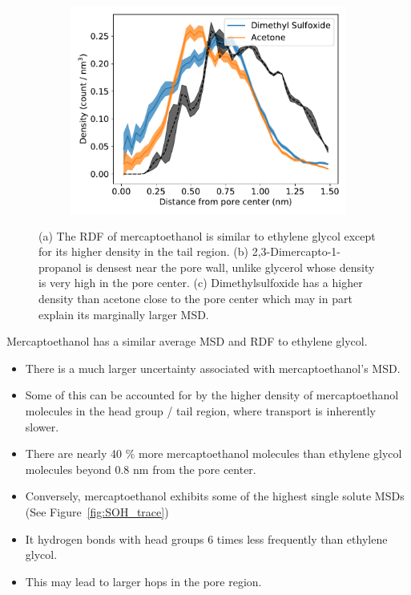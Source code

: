 \documentclass{article}
\begin{document}
\begin{figure}
\begin{subfigure}{0.325\linewidth}
  \includegraphics[width=\textwidth]{thiol_comparison_DMS.pdf}
  \caption{}\label{fig:DMP_GLY_comparison}
  \end{subfigure}
  \caption{(a) The RDF of mercaptoethanol is similar to ethylene glycol except 
  for its higher density in the tail region. (b) 2,3-Dimercapto-1-propanol is
  densest near the pore wall, unlike glycerol whose density is very high in the pore
  center. (c) Dimethylsulfoxide has a higher density than acetone close to the pore
  center which may in part explain its marginally larger MSD.}\label{fig:sulfur_analog_rdfs}
  \end{figure}
  
  \noindent Mercaptoethanol has a similar average MSD and RDF to ethylene glycol.
  \begin{itemize}
    \item There is a much larger uncertainty associated with mercaptoethanol's MSD.
    \item Some of this can be accounted for by the higher density of mercaptoethanol 
    molecules in the head group / tail region, where transport is inherently slower. 
    \item There are nearly 40 \% more mercaptoethanol molecules than ethylene 
    glycol molecules beyond 0.8 nm from the pore center. 
    \item Conversely, mercaptoethanol exhibits some of the highest single solute MSDs 
    (See Figure~\ref{fig:SOH_trace})  %
    \item It hydrogen bonds with head groups 6 times less frequently than ethylene glycol.
    \item This may lead to larger hops in the pore region.
  \end{itemize}
  
\end{document}
